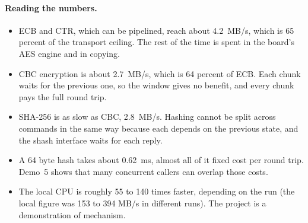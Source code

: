 \paragraph{Reading the numbers.}
\begin{itemize}
  \item ECB and CTR, which can be pipelined, reach about 4.2~MB/s, which is 65 percent of the transport ceiling. The rest of the time is spent in the board's AES engine and in copying.
  \item CBC encryption is about 2.7~MB/s, which is 64 percent of ECB. Each chunk waits for the previous one, so the window gives no benefit, and every chunk pays the full round trip.
  \item SHA-256 is as slow as CBC, 2.8~MB/s. Hashing cannot be split across commands in the same way because each  depends on the previous state, and the shash interface waits for each reply.
  \item A 64 byte hash takes about 0.62~ms, almost all of it fixed cost per round trip. Demo~5 shows that many concurrent callers can overlap those costs.
  \item The local CPU is roughly 55 to 140 times faster, depending on the run (the local figure was 153 to 394 MB/s in different runs). The project is a demonstration of mechanism.
\end{itemize}
